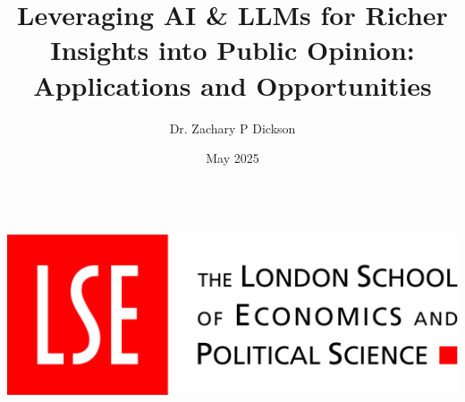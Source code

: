 \documentclass[10pt,aspectratio=169]{beamer}
\title[LLMs in Public Opinion Research]{Leveraging AI \& LLMs for Richer Insights into Public Opinion: Applications and Opportunities}
\author{Dr. Zachary P Dickson} %
\institute[LSE] %
{\noindent
  \texttt{\color{purple}z.dickson@lse.ac.uk}\\%
  \href{https://z-dickson.github.io/}{\color{blue}https://z-dickson.github.io/}\\
  Research Fellow in Quantitative Methods\\
  Research Affiliate at the LSE Data Science Institute
  
}
\date{May 2025} %
\begin{document}
{
  \begin{frame}
    \titlepage
    \vspace{-0.8cm}
    \hbox{
    \includegraphics[scale=0.03,keepaspectratio]{figures/London_school_of_economics_logo_with_name.jpg}
    }
  \end{frame}
}

\AtBeginSection[]











\end{document}
